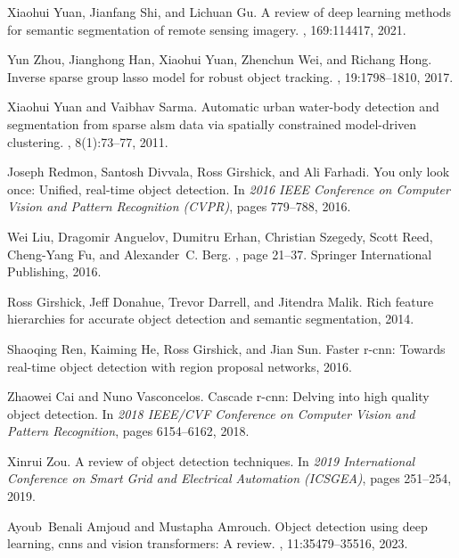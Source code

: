 \documentclass{article}
\begin{document}
%

\begin{thebibliography}{10}

Xiaohui Yuan, Jianfang Shi, and Lichuan Gu.
\newblock A review of deep learning methods for semantic segmentation of remote sensing imagery.
, 169:114417, 2021.

Yun Zhou, Jianghong Han, Xiaohui Yuan, Zhenchun Wei, and Richang Hong.
\newblock Inverse sparse group lasso model for robust object tracking.
, 19:1798--1810, 2017.

Xiaohui Yuan and Vaibhav Sarma.
\newblock Automatic urban water-body detection and segmentation from sparse alsm data via spatially constrained model-driven clustering.
, 8(1):73--77, 2011.

Joseph Redmon, Santosh Divvala, Ross Girshick, and Ali Farhadi.
\newblock You only look once: Unified, real-time object detection.
\newblock In {\em 2016 IEEE Conference on Computer Vision and Pattern Recognition (CVPR)}, pages 779--788, 2016.

Wei Liu, Dragomir Anguelov, Dumitru Erhan, Christian Szegedy, Scott Reed, Cheng-Yang Fu, and Alexander~C. Berg.
, page 21–37.
\newblock Springer International Publishing, 2016.

Ross Girshick, Jeff Donahue, Trevor Darrell, and Jitendra Malik.
\newblock Rich feature hierarchies for accurate object detection and semantic segmentation, 2014.

Shaoqing Ren, Kaiming He, Ross Girshick, and Jian Sun.
\newblock Faster r-cnn: Towards real-time object detection with region proposal networks, 2016.

Zhaowei Cai and Nuno Vasconcelos.
\newblock Cascade r-cnn: Delving into high quality object detection.
\newblock In {\em 2018 IEEE/CVF Conference on Computer Vision and Pattern Recognition}, pages 6154--6162, 2018.

Xinrui Zou.
\newblock A review of object detection techniques.
\newblock In {\em 2019 International Conference on Smart Grid and Electrical Automation (ICSGEA)}, pages 251--254, 2019.

Ayoub~Benali Amjoud and Mustapha Amrouch.
\newblock Object detection using deep learning, cnns and vision transformers: A review.
, 11:35479--35516, 2023.


\end{thebibliography}
\end{document}
